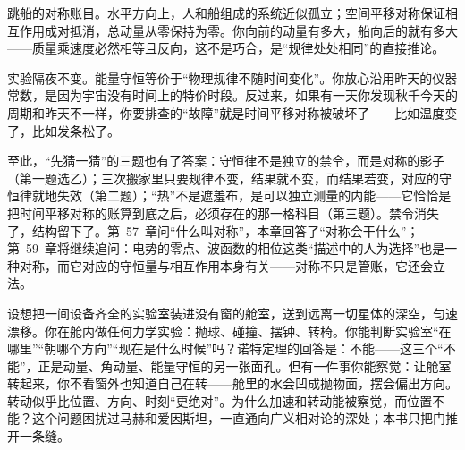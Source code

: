 跳船的对称账目。水平方向上，人和船组成的系统近似孤立；空间平移对称保证相互作用成对抵消，总动量从零保持为零。你向前的动量有多大，船向后的就有多大——质量乘速度必然相等且反向，这不是巧合，是“规律处处相同”的直接推论。

实验隔夜不变。能量守恒等价于“物理规律不随时间变化”。你放心沿用昨天的仪器常数，是因为宇宙没有时间上的特价时段。反过来，如果有一天你发现秋千今天的周期和昨天不一样，你要排查的“故障”就是时间平移对称被破坏了——比如温度变了，比如发条松了。

至此，“先猜一猜”的三题也有了答案：守恒律不是独立的禁令，而是对称的影子（第一题选乙）；三次搬家里只要规律不变，结果就不变，而结果若变，对应的守恒律就地失效（第二题）；“热”不是遮羞布，是可以独立测量的内能——它恰恰是把时间平移对称的账算到底之后，必须存在的那一格科目（第三题）。禁令消失了，结构留下了。第~57~章问“什么叫对称”，本章回答了“对称会干什么”；第~59~章将继续追问：电势的零点、波函数的相位这类“描述中的人为选择”也是一种对称，而它对应的守恒量与相互作用本身有关——对称不只是管账，它还会立法。


\begin{thought}[深空中的封闭实验室]
设想把一间设备齐全的实验室装进没有窗的舱室，送到远离一切星体的深空，匀速漂移。你在舱内做任何力学实验：抛球、碰撞、摆钟、转椅。你能判断实验室“在哪里”“朝哪个方向”“现在是什么时候”吗？诺特定理的回答是：不能——这三个“不能”，正是动量、角动量、能量守恒的另一张面孔。但有一件事你能察觉：让舱室转起来，你不看窗外也知道自己在转——舱里的水会凹成抛物面，摆会偏出方向。转动似乎比位置、方向、时刻“更绝对”。为什么加速和转动能被察觉，而位置不能？这个问题困扰过马赫和爱因斯坦，一直通向广义相对论的深处；本书只把门推开一条缝。
\end{thought}

